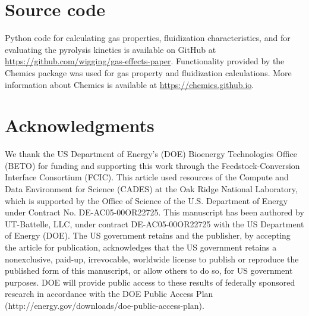 
\section{Source code}

Python code for calculating gas properties, fluidization characteristics, and for evaluating the pyrolysis kinetics is available on GitHub at \url{https://github.com/wigging/gas-effects-paper}. Functionality provided by the Chemics package was used for gas property and fluidization calculations. More information about Chemics is available at \url{https://chemics.github.io}.

\section{Acknowledgments}

We thank the US Department of Energy’s (DOE) Bioenergy Technologies Office (BETO) for funding and supporting this work through the Feedstock-Conversion Interface Consortium (FCIC). This article used resources of the Compute and Data Environment for Science (CADES) at the Oak Ridge National Laboratory, which is supported by the Office of Science of the U.S. Department of Energy under Contract No. DE-AC05-00OR22725. This manuscript has been authored by UT-Battelle, LLC, under contract DE-AC05-00OR22725 with the US Department of Energy (DOE). The US government retains and the publisher, by accepting the article for publication, acknowledges that the US government retains a nonexclusive, paid-up, irrevocable, worldwide license to publish or reproduce the published form of this manuscript, or allow others to do so, for US government purposes. DOE will provide public access to these results of federally sponsored research in accordance with the DOE Public Access Plan (http://energy.gov/downloads/doe-public-access-plan).
